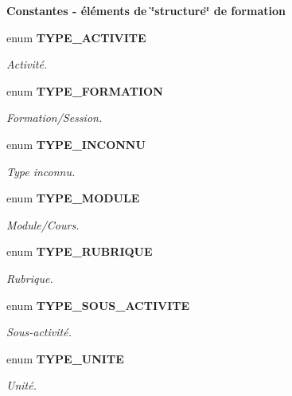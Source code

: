 \begin{Indent}{\bf Constantes - éléments de \char`\"{}structure\char`\"{} de formation}\par
\begin{CompactItemize}
\item 
enum {\bf TYPE\_\-ACTIVITE} 
\begin{CompactList}\small\item\em Activité. \item\end{CompactList}\item 
enum {\bf TYPE\_\-FORMATION} 
\begin{CompactList}\small\item\em Formation/Session. \item\end{CompactList}\item 
enum {\bf TYPE\_\-INCONNU} 
\begin{CompactList}\small\item\em Type inconnu. \item\end{CompactList}\item 
enum {\bf TYPE\_\-MODULE} 
\begin{CompactList}\small\item\em Module/Cours. \item\end{CompactList}\item 
enum {\bf TYPE\_\-RUBRIQUE} 
\begin{CompactList}\small\item\em Rubrique. \item\end{CompactList}\item 
enum {\bf TYPE\_\-SOUS\_\-ACTIVITE} 
\begin{CompactList}\small\item\em Sous-activité. \item\end{CompactList}\item 
enum {\bf TYPE\_\-UNITE} 
\begin{CompactList}\small\item\em Unité. \item\end{CompactList}\end{CompactItemize}
\end{Indent}
